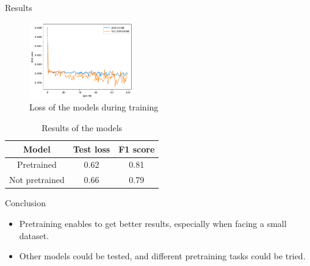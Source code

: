 \begin{frame}{Results}

    \begin{figure}
        \centering
        \includegraphics[width=0.4\textwidth]{figures/loss_train.png}
        \caption{Loss of the models during training }
    \end{figure}

    \begin{table}
        \centering
        \begin{tabular}{|c|c|c|}
            \hline
            Model & Test loss & F1 score \\
            \hline
            Pretrained & 0.62 & 0.81 \\
            \hline
            Not pretrained & 0.66 & 0.79 \\
            \hline
        \end{tabular}
        \caption{Results of the models}
    \end{table}

\end{frame}

\begin{frame}{Conclusion}

    \begin{itemize}
        \item Pretraining enables to get better results, especially when facing a small dataset.
        \item Other models could be tested, and different pretraining tasks could be tried. 
    \end{itemize}


\end{frame}